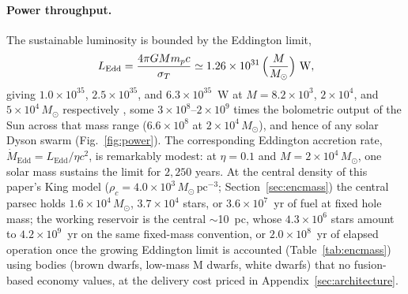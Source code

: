 \documentclass[11pt]{article}
\newcommand{\msun}{\ensuremath{M_\odot}}
\begin{document}
\paragraph{Power throughput.} The sustainable luminosity is bounded by the Eddington limit,
\begin{equation}
L_{\mathrm{Edd}} = \frac{4\pi G M m_p c}{\sigma_T} \simeq 1.26\times10^{31}\,\Bigl(\frac{M}{\msun}\Bigr)\ \mathrm{W},
\label{eq:edd}
\end{equation}
giving $1.0\times10^{35}$, $2.5\times10^{35}$, and $6.3\times10^{35}$~W at $M = 8.2\times10^{3}$, $2\times10^{4}$, and $5\times10^{4}\,\msun$ respectively \citep{FrankKingRaine2002,ShapiroTeukolsky1983}, some $3\times10^{8}$--$2\times10^{9}$ times the bolometric output of the Sun across that mass range ($6.6\times10^{8}$ at $2\times10^{4}\,\msun$), and hence of any solar Dyson swarm (Fig.~\ref{fig:power}). The corresponding Eddington accretion rate, $\dot M_{\mathrm{Edd}} = L_{\mathrm{Edd}}/\eta c^{2}$, is remarkably modest: at $\eta = 0.1$ and $M = 2\times10^{4}\,\msun$, one solar mass sustains the limit for $2{,}250$ years. At the central density of this paper's King model ($\rho_c = 4.0\times10^{3}\,\msun\,\mathrm{pc}^{-3}$; Section~\ref{sec:encmass}) the central parsec holds $1.6\times10^{4}\,\msun$, $3.7\times10^{4}$ stars, or $3.6\times10^{7}$~yr of fuel at fixed hole mass; the working reservoir is the central $\sim$10~pc, whose $4.3\times10^{6}$ stars amount to $4.2\times10^{9}$~yr on the same fixed-mass convention, or $2.0\times10^{8}$~yr of elapsed operation once the growing Eddington limit is accounted (Table~\ref{tab:encmass}) using bodies (brown dwarfs, low-mass M dwarfs, white dwarfs) that no fusion-based economy values, at the delivery cost priced in Appendix~\ref{sec:architecture}.
\end{document}
